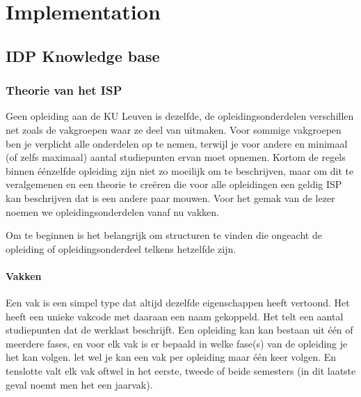 \chapter{Implementation}
\label{cha:implementation}

\section{IDP Knowledge base}

\subsection{Theorie van het ISP}
Geen opleiding aan de KU Leuven is dezelfde, de opleidingsonderdelen verschillen net zoals de vakgroepen waar ze deel van uitmaken. Voor sommige vakgroepen ben je verplicht alle onderdelen op te nemen, terwijl je voor andere en minimaal (of zelfs maximaal) aantal studiepunten ervan moet opnemen. Kortom de regels binnen \'{e}\'{e}nzelfde opleiding zijn niet zo moeilijk om te beschrijven, maar om dit te veralgemenen en een theorie te cre\"{e}ren die voor alle opleidingen een geldig ISP kan beschrijven dat is een andere paar mouwen. Voor het gemak van de lezer noemen we opleidingsonderdelen vanaf nu vakken.

Om te beginnen is het belangrijk om structuren te vinden die ongeacht de opleiding of opleidingsonderdeel telkens hetzelfde zijn.

\subsubsection{Vakken}
Een vak is een simpel type dat altijd dezelfde eigenschappen heeft vertoond. Het heeft een unieke vakcode met daaraan een naam gekoppeld. Het telt een aantal studiepunten dat de werklast beschrijft.
Een opleiding kan kan bestaan uit \'{e}\'{e}n of meerdere fases, en voor elk vak is er bepaald in welke fase(s) van de opleiding je het kan volgen. let wel je kan een vak per opleiding maar \'{e}\'{e}n keer volgen. 
En tenslotte valt elk vak oftwel in het eerste, tweede of beide semesters (in dit laatste geval noemt men het een jaarvak).

